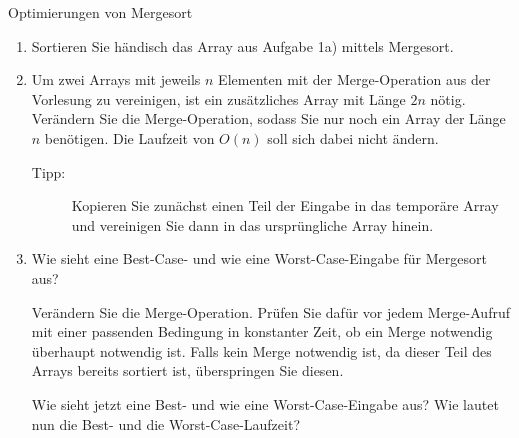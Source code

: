 \documentclass[11pt,a4paper]{article}
\begin{document}
\begin{aufgabe}{2}{Optimierungen von Mergesort}
    \begin{enumerate}
        \item Sortieren Sie händisch das Array aus Aufgabe 1a) mittels Mergesort.
        \item Um zwei Arrays mit jeweils $n$ Elementen mit der Merge-Operation aus der Vorlesung zu vereinigen, ist ein zusätzliches Array mit Länge $2n$ nötig.
        Verändern Sie die Merge-Operation, sodass Sie nur noch ein Array der Länge $n$ benötigen. Die Laufzeit von $O(n)$ soll sich dabei nicht ändern.
        \begin{description}
            \item[Tipp:] Kopieren Sie zunächst einen Teil der Eingabe in das temporäre Array und vereinigen Sie dann in das ursprüngliche Array hinein.
        \end{description}
        \item Wie sieht eine Best-Case- und wie eine Worst-Case-Eingabe für Mergesort aus?

        Verändern Sie die Merge-Operation.
        Prüfen Sie dafür vor jedem Merge-Aufruf mit einer passenden Bedingung in konstanter Zeit, ob ein Merge notwendig überhaupt notwendig ist.
        Falls kein Merge notwendig ist, da dieser Teil des Arrays bereits sortiert ist, überspringen Sie diesen.

        Wie sieht jetzt eine Best- und wie eine Worst-Case-Eingabe aus?
        Wie lautet nun die Best- und die Worst-Case-Laufzeit?
    \end{enumerate}
    
\end{aufgabe}

\end{document}
